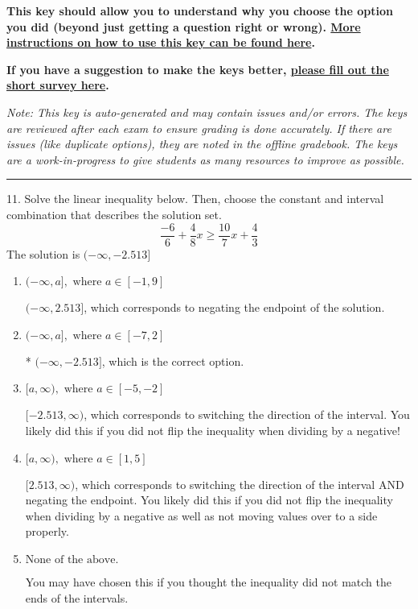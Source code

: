 \documentclass{extbook}[14pt]
\begin{document}
\textbf{This key should allow you to understand why you choose the option you did (beyond just getting a question right or wrong). \href{https://xronos.clas.ufl.edu/mac1105spring2020/courseDescriptionAndMisc/Exams/LearningFromResults}{More instructions on how to use this key can be found here}.}

\textbf{If you have a suggestion to make the keys better, \href{https://forms.gle/CZkbZmPbC9XALEE88}{please fill out the short survey here}.}

\textit{Note: This key is auto-generated and may contain issues and/or errors. The keys are reviewed after each exam to ensure grading is done accurately. If there are issues (like duplicate options), they are noted in the offline gradebook. The keys are a work-in-progress to give students as many resources to improve as possible.}

\rule{\textwidth}{0.4pt}

11. Solve the linear inequality below. Then, choose the constant and interval combination that describes the solution set.
\[ \frac{-6}{6} + \frac{4}{8} x \geq \frac{10}{7} x + \frac{4}{3} \] 
The solution is $ (-\infty, -2.513] $ 

\begin{enumerate}[label=\Alph*.] 
\item $ (-\infty, a], \text{ where } a \in [-1, 9] $ 

  $(-\infty, 2.513]$, which corresponds to negating the endpoint of the solution. 
\item $ (-\infty, a], \text{ where } a \in [-7, 2] $ 

 * $(-\infty, -2.513]$, which is the correct option. 
\item $ [a, \infty), \text{ where } a \in [-5, -2] $ 

  $[-2.513, \infty)$, which corresponds to switching the direction of the interval. You likely did this if you did not flip the inequality when dividing by a negative! 
\item $ [a, \infty), \text{ where } a \in [1, 5] $ 

  $[2.513, \infty)$, which corresponds to switching the direction of the interval AND negating the endpoint. You likely did this if you did not flip the inequality when dividing by a negative as well as not moving values over to a side properly. 
\item $ \text{None of the above}. $ 

 You may have chosen this if you thought the inequality did not match the ends of the intervals. 
\end{enumerate} 
 
\end{document}
